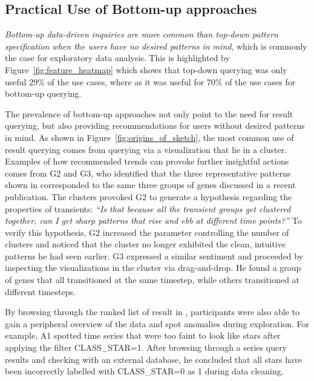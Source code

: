 \subsection{Practical Use of Bottom-up approaches}
\par \emph{Bottom-up data-driven inquiries are more common than top-down pattern specification when the users have no desired patterns in mind}, which is commonly the case for exploratory data analysis. This is highlighted by Figure~\ref{fig:feature_heatmap} which shows that top-down querying was only useful 29\% of the use cases, where as it was useful for 70\% of the use cases for bottom-up querying.
\par The prevalence of bottom-up approaches not only point to the need for result querying, but also providing recommendations for users without desired patterns in mind. As shown in Figure~\ref{fig:origins_of_sketch}, the most common use of result querying comes from querying via a visualization that lie in a cluster. Examples of how recommended trends can provoke further insightful actions comes from G2 and G3, who identified that the three representative patterns shown in \zv {}corresponded to the same three groups of genes discussed in a recent publication\cite{Gloss2017}. The clusters provoked G2 to generate a hypothesis regarding the properties of transients: \textit{``Is that because all the transient groups get clustered together, can I get sharp patterns that rise and ebb at different time points?''} To verify this hypothesis, G2 increased the parameter controlling the number of clusters and noticed that the cluster no longer exhibited the clean, intuitive patterns he had seen earlier. G3 expressed a similar sentiment and proceeded by inspecting the visualizations in the cluster via drag-and-drop. He found a group of genes that all transitioned at the same timestep, while others transitioned at different timesteps.  
\par By browsing through the ranked list of result in \zv, participants were also able to gain a peripheral overview of the data and spot anomalies during exploration. For example, A1 spotted time series that were too faint to look like stars after applying the filter CLASS\_STAR=1. After browsing through a series query results and checking with an external database, he concluded that all stars have been incorrectly labelled with CLASS\_STAR=0 as 1 during data cleaning. 
